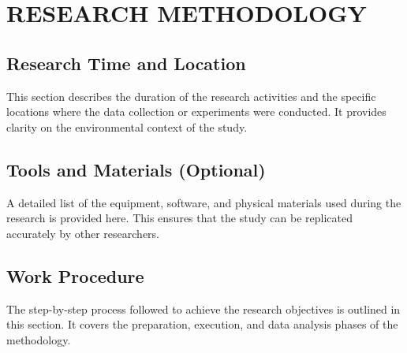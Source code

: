 \chapter{RESEARCH METHODOLOGY}

\section{Research Time and Location}
This section describes the duration of the research activities and the specific locations where the data collection or experiments were conducted. It provides clarity on the environmental context of the study.

\section{Tools and Materials (Optional)}
A detailed list of the equipment, software, and physical materials used during the research is provided here. This ensures that the study can be replicated accurately by other researchers.

\section{Work Procedure}
The step-by-step process followed to achieve the research objectives is outlined in this section. It covers the preparation, execution, and data analysis phases of the methodology.
